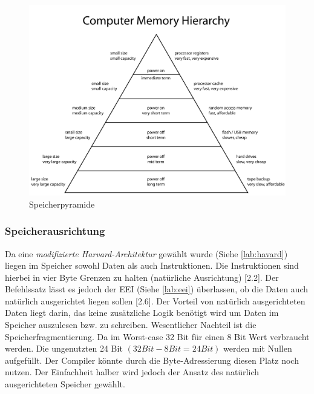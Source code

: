                 \begin{figure}[H]
                    \centering
                    \includegraphics[scale=0.2]{img/speicherpyramide.png}
                    \caption[Speicherpyramide]{Speicherpyramide \cite{memory-hierarchy}}
                    \label{fig:memory-hierarchy}
                \end{figure}


            \subsubsection{Speicherausrichtung}\label{lab:mem-order}
                Da eine \textit{modifizierte Harvard-Architektur} gewählt wurde (Siehe \ref{lab:havard}) liegen im Speicher
                sowohl Daten als auch Instruktionen. Die Instruktionen sind hierbei in vier Byte Grenzen zu halten
                (natürliche Ausrichtung) \cite{riscv-isa-specs}[2.2].
                Der Befehlssatz lässt es jedoch der EEI (Siehe \ref{lab:eei}) überlassen, ob die Daten auch natürlich ausgerichtet liegen sollen
                \cite{riscv-isa-specs}[2.6].
                Der Vorteil von natürlich ausgerichteten Daten liegt darin, das keine zusätzliche Logik benötigt wird um Daten im Speicher
                auszulesen bzw. zu schreiben. Wesentlicher Nachteil ist die Speicherfragmentierung. Da im Worst-case 32 Bit für einen 8 Bit 
                Wert verbraucht werden. Die ungenutzten 24 Bit $(32 Bit - 8 Bit = 24 Bit)$ werden mit Nullen aufgefüllt.
                Der Compiler könnte durch die Byte-Adressierung diesen Platz noch nutzen.
                Der Einfachheit halber wird jedoch der Ansatz des natürlich ausgerichteten Speicher gewählt.

                





                
            
                
            
           
            
            

            

            



            
    
        

    
